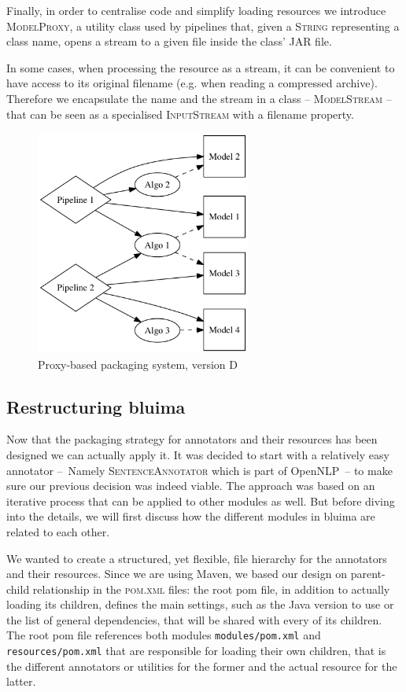 \documentclass{article}
\newcommand{\ID}[1]{{\textsc{#1}}}
\newcommand{\PATH}[1]{\mbox{\texttt{#1}}}
\newcommand{\JAR}{JAR\xspace}
\begin{document}
\begin{appendices}
Finally, in order to centralise code and simplify loading resources we introduce \ID{ModelProxy}, a
utility class used by pipelines that, given a \ID{String} representing a class name, opens a stream
to a given file inside the class' \JAR file.

In some cases, when processing the resource as a stream, it can be convenient to have access to its
original filename (e.g. when reading a compressed archive). Therefore we encapsulate the name and
the stream in a class -- \ID{ModelStream} -- that can be seen as a specialised \ID{InputStream} with
a filename property.

\begin{figure}
    \centering
    \includegraphics[width=200pt]{res/packaging_version_D.png}
    \caption{Proxy-based packaging system, version D}
    \label{fig:pkgsysD}
\end{figure}


\subsection{Restructuring bluima}
\label{sec:restructuring_bluima}

Now that the packaging strategy for annotators and their resources has been designed we can actually
apply it. It was decided to start with a relatively easy annotator --~Namely \ID{SentenceAnnotator}
which is part of OpenNLP~-- to make sure our previous decision was indeed viable. The approach was
based on an iterative process that can be applied to other modules as well. But before diving into
the details, we will first discuss how the different modules in bluima are related to each other.

We wanted to create a structured, yet flexible, file hierarchy for the annotators and their
resources. Since we are using Maven, we based our design on parent-child relationship in the
\ID{pom.xml} files: the root pom file, in addition to actually loading its children, defines the
main settings, such as the Java version to use or the list of general dependencies, that will be
shared with every of its children. The root pom file references both modules \PATH{modules/pom.xml}
and \PATH{resources/pom.xml} that are responsible for loading their own children, that is the
different annotators or utilities for the former and the actual resource for the latter.


\end{appendices}
\end{document}
